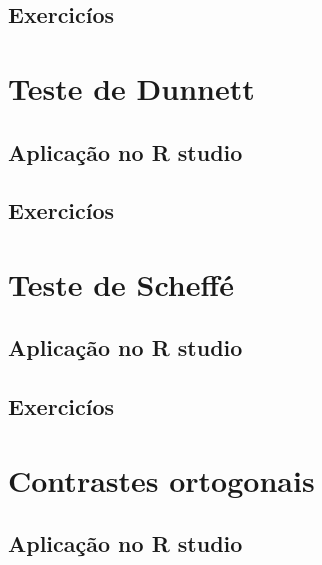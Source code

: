 \documentclass[
]{book}
\begin{document}
\hypertarget{exercicuxedos-4}{%
\subsection{Exercicíos}\label{exercicuxedos-4}}

\hypertarget{teste-de-dunnett}{%
\section{Teste de Dunnett}\label{teste-de-dunnett}}

\hypertarget{aplicauxe7uxe3o-no-r-studio-5}{%
\subsection{Aplicação no R studio}\label{aplicauxe7uxe3o-no-r-studio-5}}

\hypertarget{exercicuxedos-5}{%
\subsection{Exercicíos}\label{exercicuxedos-5}}

\hypertarget{teste-de-scheffuxe9}{%
\section{Teste de Scheffé}\label{teste-de-scheffuxe9}}

\hypertarget{aplicauxe7uxe3o-no-r-studio-6}{%
\subsection{Aplicação no R studio}\label{aplicauxe7uxe3o-no-r-studio-6}}

\hypertarget{exercicuxedos-6}{%
\subsection{Exercicíos}\label{exercicuxedos-6}}

\hypertarget{contrastes-ortogonais}{%
\section{Contrastes ortogonais}\label{contrastes-ortogonais}}

\hypertarget{aplicauxe7uxe3o-no-r-studio-7}{%
\subsection{Aplicação no R studio}\label{aplicauxe7uxe3o-no-r-studio-7}}
\end{document}

